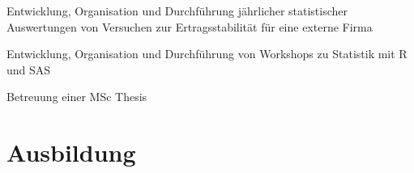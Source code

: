 \documentclass[11pt,a4paper,]{awesome-cv}
\begin{document}
\begin{cventries}
{\begin{cvitems}
\item Entwicklung, Organisation und Durchführung jährlicher statistischer Auswertungen von Versuchen zur Ertragsstabilität für eine externe Firma
\item Entwicklung, Organisation und Durchführung von Workshops zu Statistik mit R und SAS
\item Betreuung einer MSc Thesis
\end{cvitems}}
\end{cventries}

\section{Ausbildung}\label{ausbildung-1}
\end{document}
